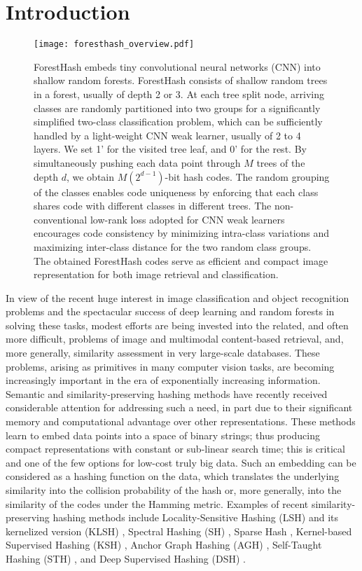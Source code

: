\documentclass[runningheads]{llncs}
\begin{document}
\section{Introduction}
\label{sec:intr}


\begin{figure*}[t]
\centering
 \texttt{[image: foresthash\_overview.pdf]}
\caption{ForestHash embeds tiny convolutional neural networks (CNN) into shallow
  random forests. ForestHash consists of shallow random trees in a forest,
  usually of depth 2 or 3. At each tree split node, arriving classes are
  randomly partitioned into two groups for a significantly simplified two-class
  classification problem, which can be sufficiently handled by a light-weight
  CNN weak learner, usually of 2 to 4 layers.  We set 1’ for the visited tree
  leaf, and 0’ for the rest. By simultaneously pushing each data point through
  $M$ trees of the depth $d$, we obtain $M (2^{d-1})$-bit hash codes.  The
  random grouping of the classes enables code uniqueness by enforcing that each
  class shares code with different classes in different trees. The
  non-conventional low-rank loss adopted for CNN weak learners encourages code
  consistency by minimizing intra-class variations and maximizing inter-class
  distance for the two random class groups.  The obtained ForestHash codes serve
  as efficient and compact image representation for both image retrieval and
  classification.  }
\label{fig:overview}
\end{figure*}




In view of the recent huge interest in image classification and object
recognition problems and the spectacular success of deep learning and random
forests in solving these tasks,  modest
efforts are being invested into the related, and often more difficult, problems
of image and multimodal content-based retrieval, and, more generally, similarity
assessment in very large-scale databases. These problems, arising as primitives
in many computer vision tasks, are becoming increasingly important in the era of
exponentially increasing information.  Semantic and similarity-preserving
hashing methods have recently received considerable attention for addressing
such a need, in part due to their significant memory and computational advantage
over other representations.  These methods learn to embed data points into a
space of binary strings; thus producing compact representations with constant or
sub-linear search time; this is critical and one of the few options for low-cost
truly big data.  Such an embedding can be considered as a hashing function on
the data, which translates the underlying similarity into the collision
probability of the hash or, more generally, into the similarity of the codes
under the Hamming metric.  Examples of recent similarity-preserving hashing
methods include Locality-Sensitive Hashing (LSH) \cite{LSH} and its kernelized
version (KLSH) \cite{KLSH}, Spectral Hashing (SH) \cite{SH}, Sparse Hash
\cite{sparsehash}, Kernel-based Supervised Hashing (KSH) \cite{KSH}, Anchor
Graph Hashing (AGH) \cite{AGH}, Self-Taught Hashing (STH) \cite{STH}, and Deep
Supervised Hashing (DSH) \cite{DSH}.
\end{document}
